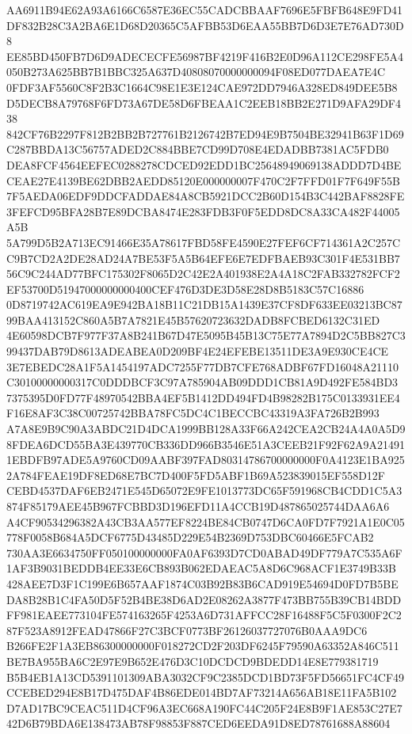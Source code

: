 \documentclass[UTF8,fontset=fandol,zihao=-4,a4paper]{ctexart}
\begin{document}
{{AA6911B94E62A93A6166C6587E36EC55CADCBBAAF7696E5FBFB648E9FD41DF832B28C3A2BA6E1D68D20365C5AFBB53D6EAA55BB7D6D3E7E76AD730D8
EE85BD450FB7D6D9ADECECFE56987BF4219F416B2E0D96A112CE298FE5A4050B273A625BB7B1BBC325A637D40808070000000094F08ED077DAEA7E4C
0FDF3AF5560C8F2B3C1664C98E1E3E124CAE972DD7946A328ED849DEE5B8D5DECB8A79768F6FD73A67DE58D6FBEAA1C2EEB18BB2E271D9AFA29DF438
842CF76B2297F812B2BB2B727761B2126742B7ED94E9B7504BE32941B63F1D69C287BBDA13C56757ADED2C884BBE7CD99D708E4EDADBB7381AC5FDB0
DEA8FCF4564EEFEC0288278CDCED92EDD1BC25648949069138ADDD7D4BECEAE27E4139BE62DBB2AEDD85120E000000007F470C2F7FFD01F7F649F55B
7F5AEDA06EDF9DDCFADDAE84A8CB5921DCC2B60D154B3C442BAF8828FE3FEFCD95BFA28B7E89DCBA8474E283FDB3F0F5EDD8DC8A33CA482F44005A5B
5A799D5B2A713EC91466E35A78617FBD58FE4590E27FEF6CF714361A2C257CC9B7CD2A2DE28AD24A7BE53F5A5B64EFE6E7EDFBAEB93C301F4E531BB7
56C9C244AD77BFC175302F8065D2C42E2A401938E2A4A18C2FAB332782FCF2EF53700D51947000000000400CEF476D3DE3D58E28D8B5183C57C16886
0D8719742AC619EA9E942BA18B11C21DB15A1439E37CF8DF633EE03213BC8799BAA413152C860A5B7A7821E45B57620723632DADB8FCBED6132C31ED
4E60598DCB7F977F37A8B241B67D47E5095B45B13C75E77A7894D2C5BB827C399437DAB79D8613ADEABEA0D209BF4E24EFEBE13511DE3A9E930CE4CE
3E7EBEDC28A1F5A1454197ADC7255F77DB7CFE768ADBF67FD16048A21110C30100000000317C0DDDBCF3C97A785904AB09DDD1CB81A9D492FE584BD3
7375395D0FD77F48970542BBA4EF5B1412DD494FD4B98282B175C0133931EE4F16E8AF3C38C00725742BBA78FC5DC4C1BECCBC43319A3FA726B2B993
A7A8E9B9C90A3ABDC21D4DCA1999BB128A33F66A242CEA2CB24A4A0A5D98FDEA6DCD55BA3E439770CB336DD966B3546E51A3CEEB21F92F62A9A21491
1EBDFB97ADE5A9760CD09AABF397FAD80314786700000000F0A4123E1BA9252A784FEAE19DF8ED68E7BC7D400F5FD5ABF1B69A523839015EF558D12F
CEBD4537DAF6EB2471E545D65072E9FE1013773DC65F591968CB4CDD1C5A3874F85179AEE45B967FCBBD3D196EFD11A4CCB19D487865025744DAA6A6
A4CF90534296382A43CB3AA577EF8224BE84CB0747D6CA0FD7F7921A1E0C05778F0058B684A5DCF6775D43485D229E54B2369D753DBC60466E5FCAB2
730AA3E6634750FF050100000000FA0AF6393D7CD0ABAD49DF779A7C535A6F1AF3B9031BEDDB4EE33E6CB893B062EDAEAC5A8D6C968ACF1E3749B33B
428AEE7D3F1C199E6B657AAF1874C03B92B83B6CAD919E54694D0FD7B5BEDA8B28B1C4FA50D5F52B4BE38D6AD2E08262A3877F473BB755B39CB14BDD
FF981EAEE773104FE574163265F4253A6D731AFFCC28F16488F5C5F0300F2C287F523A8912FEAD47866F27C3BCF0773BF26126037727076B0AAA9DC6
B266FE2F1A3EB86300000000F018272CD2F203DF6245F79590A63352A846C511BE7BA955BA6C2E97E9B652E476D3C10DCDCD9BDEDD14E8E779381719
B5B4EB1A13CD5391101309ABA3032CF9C2385DCD1BD73F5FD56651FC4CF49CCEBED294E8B17D475DAF4B86EDE014BD7AF73214A656AB18E11FA5B102
D7AD17BC9CEAC511D4CF96A3EC668A190FC44C205F24E8B9F1AE853C27E742D6B79BDA6E138473AB78F98853F887CED6EEDA91D8ED78761688A88604
}}
\end{document}
